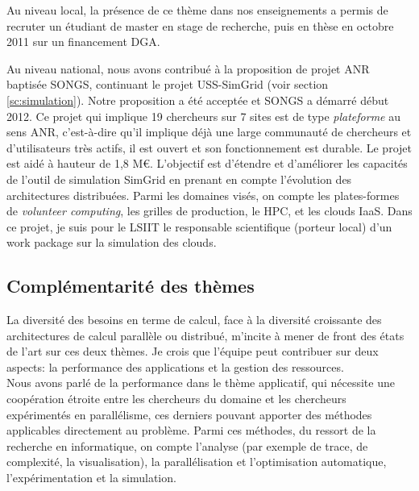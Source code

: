 \documentclass[11pt]{article}
\begin{document}
Au niveau local, la présence de ce thème dans nos enseignements a permis de 
recruter un étudiant de master en stage de recherche, puis en thèse en
octobre 2011 sur un financement DGA.

Au niveau national, nous avons contribué à la proposition de projet ANR 
baptisée SONGS, continuant le projet USS-SimGrid (voir section~%
\ref{sc:simulation}). Notre proposition a été acceptée et SONGS a démarré 
début 2012. Ce projet qui implique 19 chercheurs sur 7 sites est de type 
\emph{plateforme} au sens ANR, c'est-à-dire qu'il implique déjà une large 
communauté de chercheurs et d'utilisateurs très actifs, il est ouvert et 
son fonctionnement est durable. Le projet est aidé à hauteur de 1,8 M\euro{}.
L'objectif est d'étendre et d'améliorer les capacités de l'outil de 
simulation SimGrid en prenant en compte l'évolution des architectures 
distribuées. Parmi les domaines visés, on compte les plates-formes de 
\emph{volunteer computing}, les grilles de production, le HPC, et les 
clouds IaaS. Dans ce projet, je suis pour le LSIIT le responsable 
scientifique (porteur local) d'un work package sur la simulation des 
clouds.


\subsection*{Complémentarité des thèmes}

La diversité des besoins en terme de calcul, face à la diversité croissante des
architectures de calcul parallèle ou distribué, m'incite à mener de front des 
états de l'art sur ces deux thèmes. Je crois que l'équipe peut contribuer sur 
deux aspects: la performance des applications et la gestion des ressources.\\

Nous avons parlé de la performance dans le thème applicatif, qui nécessite une 
coopération étroite entre les chercheurs du domaine et les chercheurs 
expérimentés en parallélisme, ces derniers pouvant apporter des méthodes 
applicables directement au problème. Parmi ces méthodes, du ressort de la 
recherche en informatique, on compte l'analyse (par exemple de trace, de 
complexité, la visualisation), la parallélisation et l'optimisation automatique, 
l'expérimentation et la simulation.\\
\end{document}
